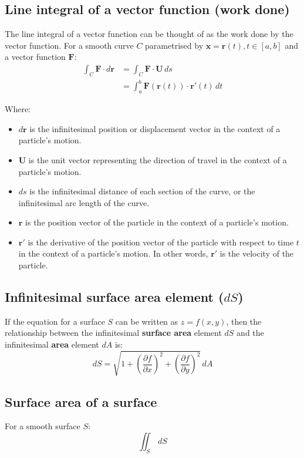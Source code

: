 \documentclass[11pt]{article}
\begin{document}
 \newpage
\subsection{Line integral of a vector function (work done)}
\label{sec:org8422f17}
The line integral of a vector function can be thought of as the work done by the vector function.
For a smooth curve \(C\) parametrised by \(\boldsymbol{x} = \boldsymbol{r} (t), t \in [a, b]\) and a vector function \(\boldsymbol{F}\):
\begin{align*}
\int_C \boldsymbol{F} \cdot d \boldsymbol{r} &= \int_C \boldsymbol{F} \cdot \boldsymbol{U} \, ds \\
&= \int_a^b \boldsymbol{F} (\boldsymbol{r} (t)) \cdot \boldsymbol{r'} (t) \, dt
\end{align*}

Where:
\begin{itemize}
\item \(d \boldsymbol{r}\) is the infinitesimal position or displacement vector in the context of a particle's motion.
\item \(\boldsymbol{U}\) is the unit vector representing the direction of travel in the context of a particle's motion.
\item \(ds\) is the infinitesimal distance of each section of the curve, or the infinitesimal arc length of the curve.
\item \(\boldsymbol{r}\) is the position vector of the particle in the context of a particle's motion.
\item \(\boldsymbol{r'}\) is the derivative of the position vector of the particle with respect to time \(t\) in the context of a particle's motion. In other words, \(\boldsymbol{r'}\) is the velocity of the particle.
\end{itemize}
\subsection{Infinitesimal surface area element (\(dS\))}
\label{sec:org576484a}
If the equation for a surface \(S\) can be written as \(z = f(x, y)\), then the relationship between the infinitesimal \textbf{surface area} element \(dS\) and the infinitesimal \textbf{area} element \(dA\) is:
\[dS = \sqrt{1 + \left(\frac{\partial f}{\partial x} \right)^2 + \left(\frac{\partial f}{\partial y} \right)^2} \, dA\]
\subsection{Surface area of a surface}
\label{sec:org14c7818}
For a smooth surface \(S\):
\[\iint_S \, dS\]
\end{document}
